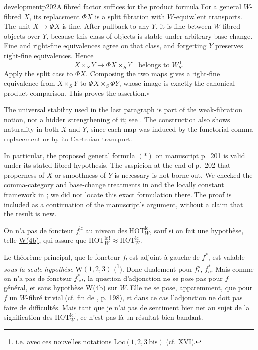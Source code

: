 \begin{dcomment}{development}{p202}{A fibred factor suffices for the product formula}
For a general $W$-fibred $X$, its replacement $\Phi X$ is a split fibration with $W$-equivalent transports. The unit $X\to\Phi X$ is fine. After pullback to any $Y$, it is fine between $W$-fibred objects over $Y$, because this class of objects is stable under arbitrary base change. Fine and right-fine equivalences agree on that class, and forgetting $Y$ preserves right-fine equivalences. Hence
\[
 X\times_S Y\longrightarrow\Phi X\times_S Y
       \quad\text{belongs to }W_S^{\mathrm d}.
\]
Apply the split case to $\Phi X$. Composing the two maps gives a right-fine equivalence from $X\times_S Y$ to $\Phi X\times_S\Phi Y$, whose image is exactly the canonical product comparison. This proves the assertion.\hfill$\square$

The universal stability used in the last paragraph is part of the weak-fibration notion, not a hidden strengthening of it; see \citet[Chapter~XII, Part~III, Theorem~3, manuscript pp.~51--52]{Grothendieck1990XIIa}. The construction also shows naturality in both $X$ and $Y$, since each map was induced by the functorial comma replacement or by its Cartesian transport.

In particular, the proposed general formula $(*)$ on manuscript p.~201 is valid under its stated fibred hypothesis. The suspicion at the end of p.~202 that properness of $X$ or smoothness of $Y$ is necessary is not borne out. We checked the comma-category and base-change treatments in \citet[\S\S4--5]{Maltsiniotis2005Asphericite} and the locally constant framework in \citet{Cisinski2009LocallyConstant}; we did not locate this exact formulation there. The proof is included as a continuation of the manuscript's argument, without a claim that the result is new.
\end{dcomment}



On n'a pas de foncteur $f_!^{\mathrm{lc}}$ au niveau des $\mathrm{HOT}_W^{\mathrm{lc}}$, sauf si on fait une hypothèse, telle \underline{W(4b)}, qui assure que $\mathrm{HOT}_W^{\mathrm{lc}\,!} \approx \mathrm{HOT}_W^{\mathrm{lc}}$.

Le théorème principal, que le foncteur $f_!$ est adjoint à gauche de $f^*$, est valable \textit{sous la seule hypothèse} W$(1,2,3)$ (\footnote{i.e. avec ces nouvelles notations Loc$(1,2,3\ \text{bis})$ (cf. XVI).}). Donc dualement pour $f_!^{o}$, $f_{o}^*$. Mais comme on n'a pas de foncteur $f_{\mathrm{lc}\,!}^*$, la question d'adjonction ne se pose pas pour $f$ général, et sans hypothèse W(4b) sur $W$. Elle ne se pose, apparemment, que pour $f$ un $W$-fibré trivial (cf. fin de , p. 198), et dans ce cas l'adjonction ne doit pas faire de difficultés. Mais tant que je n'ai pas de sentiment bien net au sujet de la signification des $\mathrm{HOT}_W^{\mathrm{lc}\,!}$, ce n'est pas là un résultat bien bandant.

